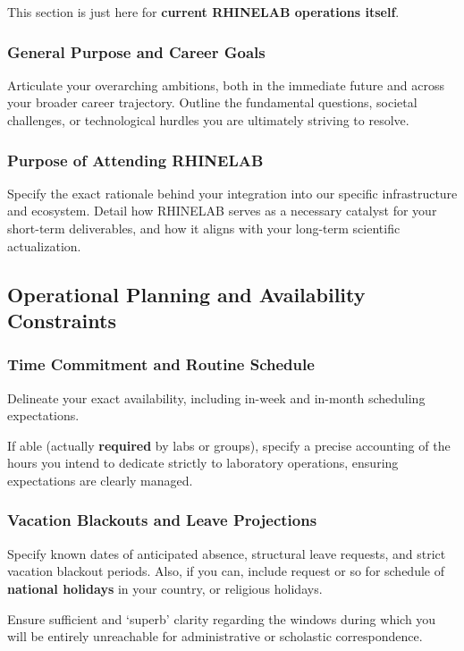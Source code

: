 \documentclass[10pt,a4paper]{article}
\begin{document}
This section is just here for \textbf{current RHINELAB operations itself}.

\subsubsection{General Purpose and Career Goals}
Articulate your overarching ambitions, both in the immediate future and across your broader career trajectory. Outline the fundamental questions, societal challenges, or technological hurdles you are ultimately striving to resolve.

\subsubsection{Purpose of Attending RHINELAB}
Specify the exact rationale behind your integration into our specific infrastructure and ecosystem. Detail how RHINELAB serves as a necessary catalyst for your short-term deliverables, and how it aligns with your long-term scientific actualization.

\subsection{Operational Planning and Availability Constraints}

\subsubsection{Time Commitment and Routine Schedule}
Delineate your exact availability, including in-week and in-month scheduling expectations. 

If able (actually \textbf{required} by labs or groups), specify a precise accounting of the hours you intend to dedicate strictly to laboratory operations, ensuring expectations are clearly managed.

\subsubsection{Vacation Blackouts and Leave Projections}
Specify known dates of anticipated absence, structural leave requests, and strict vacation blackout periods. Also, if you can, include request or so for schedule of \textbf{national holidays} in your country, or religious holidays. 

Ensure sufficient and `superb' clarity regarding the windows during which you will be entirely unreachable for administrative or scholastic correspondence.
\end{document}
